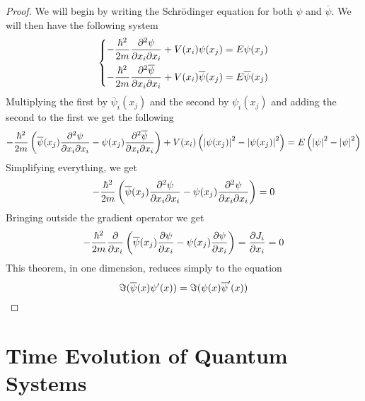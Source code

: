 \documentclass[../qm.tex]{subfiles}
\begin{document}
	\begin{proof}
		We will begin by writing the Schrödinger equation for both $\psi$ and $\overline{\psi}$. We will then have the following system
		\begin{equation*}
			\left\{\begin{aligned}
					-\frac{\hbar^2}{2m}\pdv{\psi}{x_i}{x_i}+V(x_i)\psi(x_j)&=E\psi(x_j)\\
					-\frac{\hbar^2}{2m}\pdv{\overline{\psi}}{x_i}{x_i}+V(x_i)\overline{\psi}(x_j)&=E\overline{\psi}(x_j)
			\end{aligned}\right.
		\end{equation*}
		Multiplying the first by $\overline{\psi}_i(x_j)$ and the second by $\psi_i(x_j)$ and adding the second to the first we get the following
		\begin{equation*}
			-\frac{\hbar^2}{2m}\left( \overline{\psi}(x_j)\pdv{\psi}{x_i}{x_i}-\psi(x_j)\pdv{\overline{\psi}}{x_i}{x_i} \right)+V(x_i)\left(\abs{\psi(x_j)}^2-\abs{\psi(x_j)}^2\right)=E\left( \abs{\psi}^2-\abs{\psi}^2 \right)
		\end{equation*}
		Simplifying everything, we get
		\begin{equation*}
			-\frac{\hbar^2}{2m}\left( \overline{\psi}(x_j)\pdv{\psi}{x_i}{x_i}-\psi(x_j)\pdv{\psi}{x_i}{x_i} \right)=0
		\end{equation*}
		Bringing outside the gradient operator we get
		\begin{equation*}
			-\frac{\hbar^2}{2m}\pdv{}{x_i}\left( \overline{\psi}(x_j)\pdv{\psi}{x_i}-\psi(x_j)\pdv{\psi}{x_i} \right)=\pdv{J_i}{x_i}=0
		\end{equation*}
		This theorem, in one dimension, reduces simply to the equation
		\begin{equation*}
			\imaginary(\overline{\psi}(x)\psi'(x))=\imaginary(\psi(x)\overline{\psi}'(x))
		\end{equation*}
	\end{proof}
	\section{Time Evolution of Quantum Systems}
\end{document}
